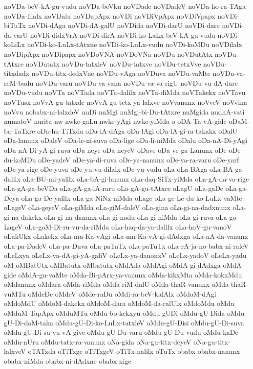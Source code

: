 {noVDa-beV-kA-gu-vudu
noVDa-beVku
noVDade
noVDadeV
noVDa-ho-ra-TAga
noVDa-lilalx
noVDalu
noVDapApx
noVDi
noVDiVpApx
noVDiVpapx
noVDi-biTuTx
noVDi-dAga
noVDi-dA-galU
noVDida
noVDi-darU
noVDi-dare
noVDi-da-varU
noVDi-didxVrA
noVDi-dirA
noVDi-ko-LaLx-beV-kA-gu-vudu
noVDi-koLiLx
noVDi-ko-LuLx-tAtxne
noVDi-ko-LuLx-vudu
noVDi-koMDu
noVDilalx
noVDipApx
noVDipapx
noVDoVNA
noVDoVNa
noVDu
noVDutAtx
noVDu-tAtxre
noVDutatx
noVDu-tatxleV
noVDu-tatxve
noVDu-tetxVve
noVDu-titxdadx
noVDu-titx-dedxVne
noVDu-vAga
noVDuva
noVDu-vaMte
noVDu-va-reM-budu
noVDu-varu
noVDu-va-vana
noVDu-va-va-rigU
noVDu-vu-dA-dare
noVDu-vudu
noVTa
noVTada
noVTa-dalilx
noVTa-diMda
noVTakekx
noVTavu
noVTusx
noVvA-gu-tatxde
noVvA-gu-tetx-ya-lalxve
noVvanunx
noVveV
noVvina
noVvu
nobabx-ni-lalxdeV
nuDi
nuMgi
nuMgi-bi-Du-tAtxre
nuMgida
nudhA-vati
numatoV
nurita
nw
nwke-gaLu
nwke-yAgi
nwke-yiMda
o
oDA-Ta-vA-gide
oDaM-ba-TaTxre
oDa-hu-TiTxda
oDa-lA-dAga
oDa-lAgi
oDa-lA-gi-ra-takakx
oDalU
oDa-lanunx
oDaleV
oDa-le-ni-suva
oDa-lige
oDa-li-niMda
oDalu
oDa-nA-Di-yAgi
oDa-nA-Di-yA-gi-ruva
oDa-neye
oDa-neyeV
oDave
oDa-ve-ga-Lanunx
oDe
oDe-du-koMDu
oDe-yadeV
oDe-ya-di-ruva
oDe-ya-nanunx
oDe-ya-ra-varu
oDe-yarf
oDe-ya-rige
oDe-yuva
oDe-yu-vu-dilalx
oDe-yu-vudu
oLa
oLa-BAga
oLa-BA-ga-dalilx
oLa-BU-mi-yalilx
oLa-bA-gi-lanunx
oLa-daq-SiTx-yiMda
oLa-gA-da-va-rige
oLa-gA-ga-beVDa
oLa-gA-ga-lA-raru
oLa-gA-gu-tAtxre
oLagU
oLa-gaDe
oLa-ga-Deya
oLa-ga-De-yalilx
oLa-ga-NiNx-niMda
oLage
oLa-ge-Le-du-ko-LuLx-vaMte
oLageV
oLa-geyeV
oLa-giMda
oLa-giM-daleV
oLa-gina
oLa-gi-na-dadxnunx
oLa-gi-na-dakekx
oLa-gi-na-danunx
oLa-gi-nadu
oLa-gi-niMda
oLa-gi-ruva
oLa-go-LageV
oLa-goM-Di-ru-vu-da-riMda
oLa-haq-da-ya-dalilx
oLa-hoV-gu-vanoV
oLakUkx
oLakekx
oLa-mu-Ka-vAgi
oLa-mu-Ka-vA-gi-dAdxga
oLa-nA-da-vanunx
oLa-pa-DadeV
oLa-pa-Duva
oLa-paTaTx
oLa-paTuTx
oLa-rA-ja-no-babx-ni-raleV
oLeLxya
oLeLx-ya-dA-gi-yA-galiV
oLeLx-ya-danonxV
oLeLx-yadoV
oLeLx-yadu
oM
oMBatUtx
oMBatutx
oMbatutx
oMdAda
oMdAgi
oMdA-gi-dAdxga
oMdA-gide
oMdA-gu-vaMte
oMda-Bi-pArx-ya-vanunx
oMda-kikxMta
oMda-kokxMdu
oMdanunx
oMdara
oMda-riMda
oMda-riM-dalU
oMda-thaR-vanunx
oMda-thaR-vuMTu
oMdeDe
oMdeV
oMde-raDu
oMdi-ra-beV-kalAlx
oMdoM-dAgi
oMdoMdU
oMdoM-dakekx
oMdoM-dara
oMdoM-da-ralUlx
oMdoMdu
oMdu
oMduM-TapApx
oMduMTu
oMdu-bo-kekxyu
oMdu-gUDi
oMdu-gU-Dida
oMdu-gU-Di-daM-taha
oMdu-gU-Di-ko-LuLx-tatxleV
oMdu-gU-Disi
oMdu-gU-Di-suva
oMdu-gU-Di-su-vu-vA-give
oMdu-gU-Du-varu
oMdu-gU-Du-vudu
oMdu-kaDe
oMdu-nUru
oMdu-tatx-ra-vanunx
oNa-gida
oNa-gu-titx-deyeV
oNa-gu-titx-lalxveV
oTATxda
oTiTxge
oTiTxgeV
oTiTx-nalilx
oTuTx
obabx
obabx-nanunx
obabx-niMda
obabx-ni-dAdxne
obabx-nige
}
